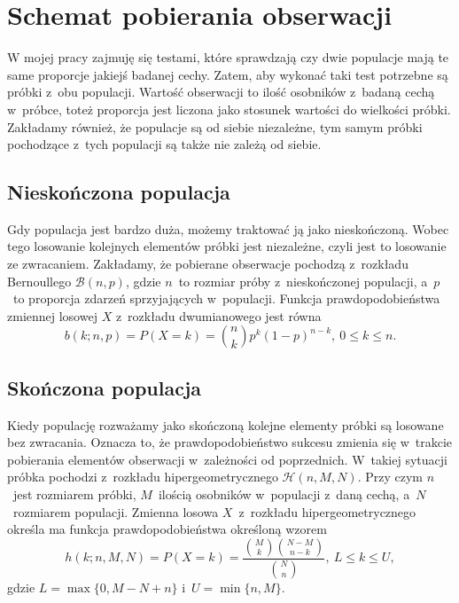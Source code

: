 \chapter{Schemat pobierania obserwacji}

W mojej pracy zajmuję się testami, które sprawdzają czy dwie populacje mają te same proporcje jakiejś badanej cechy. Zatem, aby wykonać taki test potrzebne są próbki z~obu populacji. Wartość obserwacji to ilość osobników z~badaną cechą w~próbce, toteż proporcja jest liczona jako stosunek wartości do wielkości próbki. Zakładamy również, że populacje są od siebie niezależne, tym samym próbki pochodzące z~tych populacji są także nie zależą od siebie. 


\section{Nieskończona populacja}
Gdy populacja jest bardzo duża, możemy traktować ją jako nieskończoną. Wobec tego losowanie kolejnych elementów próbki jest niezależne, czyli jest to losowanie ze zwracaniem. Zakładamy, że pobierane obserwacje pochodzą z~rozkładu Bernoullego $\mathcal{B}(n,p)$, gdzie $n$~to rozmiar próby z~nieskończonej populacji, a~$p$~to proporcja zdarzeń sprzyjających w~populacji. Funkcja prawdopodobieństwa zmiennej losowej $X$ z~rozkładu dwumianowego jest równa
\begin{equation}
b(k;n,p) = P(X=k) = \binom{n}{k} p^k (1-p)^{n-k},\ 0\leq k\leq n.
\end{equation}

\section{Skończona populacja}
\label{r1:skonczonapopulacja}
Kiedy populację rozważamy jako skończoną kolejne elementy próbki są losowane bez zwracania. Oznacza to, że prawdopodobieństwo sukcesu zmienia się w~trakcie pobierania elementów obserwacji w~zależności od poprzednich. W~takiej sytuacji próbka pochodzi z~rozkładu hipergeometrycznego $\mathcal{H}(n,M,N)$. Przy czym $n$~jest rozmiarem próbki, $M$~ilością osobników w~populacji z~daną cechą, a~$N$~rozmiarem populacji. Zmienna losowa $X$~z~rozkładu hipergeometrycznego określa ma funkcja prawdopodobieństwa określoną wzorem
\begin{equation}
h(k;n,M,N) = P(X=k) = \frac{\binom{M}{k} \binom{N-M}{n-k}}{\binom{N}{n}},\ L\leq k\leq U,
\end{equation}
gdzie $L=\max\{0,M-N+n\}$ i~$U=\min\{n,M\}$.

